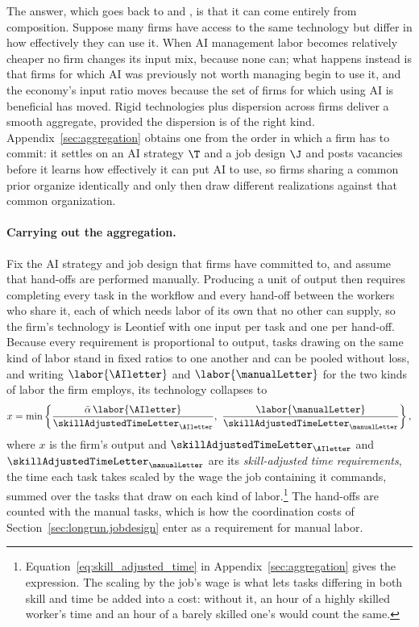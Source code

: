 The answer, which goes back to \citet{houthakker1955pareto} and \citet{levhari1968note}, is that it can come entirely from composition.
Suppose many firms have access to the same technology but differ in how effectively they can use it.
When AI management labor becomes relatively cheaper no firm changes its input mix, because none can; what happens instead is that firms for which AI was previously not worth managing begin to use it, and the economy's input ratio moves because the set of firms for which using AI is beneficial has moved.
Rigid technologies plus dispersion across firms deliver a smooth aggregate, provided the dispersion is of the right kind.
Appendix~\ref{sec:aggregation} obtains one from the order in which a firm has to commit: it settles on an AI strategy $\T$ and a job design $\J$ and posts vacancies before it learns how effectively it can put AI to use, so firms sharing a common prior organize identically and only then draw different realizations against that common organization.

\paragraph{Carrying out the aggregation.}
Fix the AI strategy and job design that firms have committed to, and assume that hand-offs are performed manually.
Producing a unit of output then requires completing every task in the workflow and every hand-off between the workers who share it, each of which needs labor of its own that no other can supply, so the firm's technology is Leontief with one input per task and one per hand-off.
Because every requirement is proportional to output, tasks drawing on the same kind of labor stand in fixed ratios to one another and can be pooled without loss, and writing $\labor{\AIletter}$ and $\labor{\manualLetter}$ for the two kinds of labor the firm employs, its technology collapses to
\begin{align}
\label{eq:lr_micro_prod}
x = \min\left\{ \frac{\bar{\alpha}\,\labor{\AIletter}}{\skillAdjustedTimeLetter_{\AIletter}}, \ \frac{\labor{\manualLetter}}{\skillAdjustedTimeLetter_{\manualLetter}} \right\},
\end{align}
where $x$ is the firm's output and $\skillAdjustedTimeLetter_{\AIletter}$ and $\skillAdjustedTimeLetter_{\manualLetter}$ are its \emph{skill-adjusted time requirements}, the time each task takes scaled by the wage the job containing it commands, summed over the tasks that draw on each kind of labor.\footnote{
Equation~\eqref{eq:skill_adjusted_time} in Appendix~\ref{sec:aggregation} gives the expression.
The scaling by the job's wage is what lets tasks differing in both skill and time be added into a cost: without it, an hour of a highly skilled worker's time and an hour of a barely skilled one's would count the same.
}
The hand-offs are counted with the manual tasks, which is how the coordination costs of Section~\ref{sec:longrun.jobdesign} enter as a requirement for manual labor.

